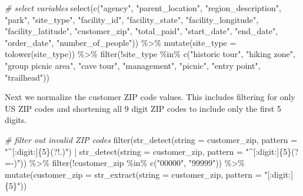 \documentclass[
  11 pt,
  openany]{book}
\newenvironment{Shaded}{\begin{snugshade}}{\end{snugshade}}
\newcommand{\AttributeTok}[1]{\textcolor[rgb]{0.77,0.63,0.00}{#1}}
\newcommand{\CommentTok}[1]{\textcolor[rgb]{0.56,0.35,0.01}{\textit{#1}}}
\newcommand{\FunctionTok}[1]{\textcolor[rgb]{0.00,0.00,0.00}{#1}}
\newcommand{\NormalTok}[1]{#1}
\newcommand{\SpecialCharTok}[1]{\textcolor[rgb]{0.00,0.00,0.00}{#1}}
\newcommand{\StringTok}[1]{\textcolor[rgb]{0.31,0.60,0.02}{#1}}
\begin{document}
\begin{Shaded}
\begin{Highlighting}[]
\CommentTok{\# select variables}
\FunctionTok{select}\NormalTok{(}\FunctionTok{c}\NormalTok{(}\StringTok{"agency"}\NormalTok{, }\StringTok{"parent\_location"}\NormalTok{, }\StringTok{"region\_description"}\NormalTok{, }
         \StringTok{"park"}\NormalTok{, }\StringTok{"site\_type"}\NormalTok{, }\StringTok{"facility\_id"}\NormalTok{, }\StringTok{"facility\_state"}\NormalTok{, }
         \StringTok{"facility\_longitude"}\NormalTok{, }\StringTok{"facility\_latitude"}\NormalTok{, }
         \StringTok{"customer\_zip"}\NormalTok{, }\StringTok{"total\_paid"}\NormalTok{, }\StringTok{"start\_date"}\NormalTok{,}
         \StringTok{"end\_date"}\NormalTok{, }\StringTok{"order\_date"}\NormalTok{, }\StringTok{"number\_of\_people"}\NormalTok{)) }\SpecialCharTok{\%\textgreater{}\%}
  \FunctionTok{mutate}\NormalTok{(}\AttributeTok{site\_type =} \FunctionTok{tolower}\NormalTok{(site\_type)) }\SpecialCharTok{\%\textgreater{}\%}
  \FunctionTok{filter}\NormalTok{(}\SpecialCharTok{!}\NormalTok{site\_type }\SpecialCharTok{\%in\%} \FunctionTok{c}\NormalTok{(}\StringTok{"historic tour"}\NormalTok{, }\StringTok{"hiking zone"}\NormalTok{, }
                           \StringTok{"group picnic area"}\NormalTok{, }\StringTok{"cave tour"}\NormalTok{,}
                           \StringTok{"management"}\NormalTok{, }\StringTok{"picnic"}\NormalTok{, }
                           \StringTok{"entry point"}\NormalTok{, }\StringTok{"trailhead"}\NormalTok{))}
\end{Highlighting}
\end{Shaded}

Next we normalize the customer ZIP code values. This includes filtering for only US ZIP codes and shortening all 9 digit ZIP codes to include only the first 5 digits.

\begin{Shaded}
\begin{Highlighting}[]
\CommentTok{\# filter out invalid ZIP codes}
\FunctionTok{filter}\NormalTok{(}\FunctionTok{str\_detect}\NormalTok{(}\AttributeTok{string =}\NormalTok{ customer\_zip,}
                  \AttributeTok{pattern =} \StringTok{"\^{}[:digit:]\{5\}(?!.)"}\NormalTok{) }\SpecialCharTok{|}
         \FunctionTok{str\_detect}\NormalTok{(}\AttributeTok{string =}\NormalTok{ customer\_zip,}
                    \AttributeTok{pattern =} \StringTok{"\^{}[:digit:]\{5\}(?={-})"}\NormalTok{)) }\SpecialCharTok{\%\textgreater{}\%}
  \FunctionTok{filter}\NormalTok{(}\SpecialCharTok{!}\NormalTok{customer\_zip }\SpecialCharTok{\%in\%} \FunctionTok{c}\NormalTok{(}\StringTok{"00000"}\NormalTok{, }\StringTok{"99999"}\NormalTok{)) }\SpecialCharTok{\%\textgreater{}\%}
  \FunctionTok{mutate}\NormalTok{(}\AttributeTok{customer\_zip =} \FunctionTok{str\_extract}\NormalTok{(}\AttributeTok{string =}\NormalTok{ customer\_zip,}
                                    \AttributeTok{pattern =} \StringTok{"[:digit:]\{5\}"}\NormalTok{))}
\end{Highlighting}
\end{Shaded}
\end{document}
